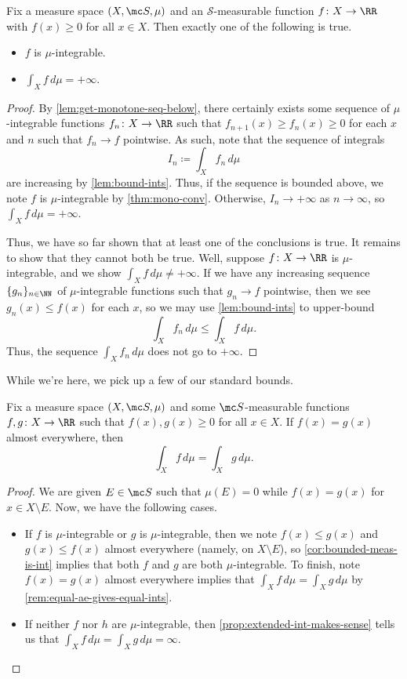\documentclass[../notes.tex]{subfiles}
\begin{document}
\begin{proposition} \label{prop:extended-int-makes-sense}
	Fix a measure space $(X,\mc S,\mu)$ and an $\mathcal S$-measurable function $f\colon X\to\RR$ with $f(x)\ge0$ for all $x\in X$. Then exactly one of the following is true.
	\begin{itemize}
		\item $f$ is $\mu$-integrable.
		\item $\int_Xf\,d\mu=+\infty$.
	\end{itemize}
\end{proposition}
\begin{proof}
	By \autoref{lem:get-monotone-seq-below}, there certainly exists some sequence of $\mu$-integrable functions $f_n\colon X\to\RR$ such that $f_{n+1}(x)\ge f_n(x)\ge0$ for each $x$ and $n$ such that $f_n\to f$ pointwise. As such, note that the sequence of integrals
	\[I_n\coloneqq\int_Xf_n\,d\mu\]
	are increasing by \autoref{lem:bound-ints}. Thus, if the sequence is bounded above, we note $f$ is $\mu$-integrable by \autoref{thm:mono-conv}. Otherwise, $I_n\to+\infty$ as $n\to\infty$, so $\int_Xf\,d\mu=+\infty$.

	Thus, we have so far shown that at least one of the conclusions is true. It remains to show that they cannot both be true. Well, suppose $f\colon X\to\RR$ is $\mu$-integrable, and we show $\int_Xf\,d\mu\ne+\infty$. If we have any increasing sequence $\{g_n\}_{n\in\NN}$ of $\mu$-integrable functions such that $g_n\to f$ pointwise, then we see $g_n(x)\le f(x)$ for each $x$, so we may use \autoref{lem:bound-ints} to upper-bound
	\[\int_Xf_n\,d\mu\le\int_Xf\,d\mu.\]
	Thus, the sequence $\int_Xf_n\,d\mu$ does not go to $+\infty$.
\end{proof}
While we're here, we pick up a few of our standard bounds.
\begin{lemma} \label{lem:extended-equal-ae-gives-equal-ints}
	Fix a measure space $(X,\mc S,\mu)$ and some $\mc S$-measurable functions $f,g\colon X\to\RR$ such that $f(x),g(x)\ge0$ for all $x\in X$. If $f(x)=g(x)$ almost everywhere, then
	\[\int_Xf\,d\mu=\int_Xg\,d\mu.\]
\end{lemma}
\begin{proof}
	We are given $E\in\mc S$ such that $\mu(E)=0$ while $f(x)=g(x)$ for $x\in X\setminus E$. Now, we have the following cases.
	\begin{itemize}
		\item If $f$ is $\mu$-integrable or $g$ is $\mu$-integrable, then we note $f(x)\le g(x)$ and $g(x)\le f(x)$ almost everywhere (namely, on $X\setminus E$), so \autoref{cor:bounded-meas-is-int} implies that both $f$ and $g$ are both $\mu$-integrable. To finish, note $f(x)=g(x)$ almost everywhere implies that $\int_Xf\,d\mu=\int_Xg\,d\mu$ by \autoref{rem:equal-ae-gives-equal-ints}.
		\item If neither $f$ nor $h$ are $\mu$-integrable, then \autoref{prop:extended-int-makes-sense} tells us that $\int_Xf\,d\mu=\int_Xg\,d\mu=\infty$.
		\qedhere
	\end{itemize}
\end{proof}
\end{document}
